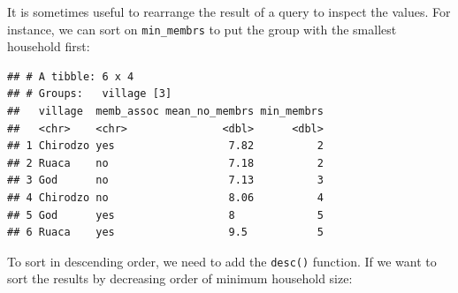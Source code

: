 \documentclass[]{book}
\newenvironment{Shaded}{\begin{snugshade}}{\end{snugshade}}
\newcommand{\KeywordTok}[1]{\textcolor[rgb]{0.13,0.29,0.53}{\textbf{#1}}}
\newcommand{\DataTypeTok}[1]{\textcolor[rgb]{0.13,0.29,0.53}{#1}}
\newcommand{\StringTok}[1]{\textcolor[rgb]{0.31,0.60,0.02}{#1}}
\newcommand{\OperatorTok}[1]{\textcolor[rgb]{0.81,0.36,0.00}{\textbf{#1}}}
\newcommand{\NormalTok}[1]{#1}
\begin{document}
It is sometimes useful to rearrange the result of a query to inspect the
values. For instance, we can sort on \texttt{min\_membrs} to put the
group with the smallest household first:

\begin{Shaded}
\end{Shaded}

\begin{verbatim}
## # A tibble: 6 x 4
## # Groups:   village [3]
##   village  memb_assoc mean_no_membrs min_membrs
##   <chr>    <chr>               <dbl>      <dbl>
## 1 Chirodzo yes                  7.82          2
## 2 Ruaca    no                   7.18          2
## 3 God      no                   7.13          3
## 4 Chirodzo no                   8.06          4
## 5 God      yes                  8             5
## 6 Ruaca    yes                  9.5           5
\end{verbatim}

To sort in descending order, we need to add the \texttt{desc()}
function. If we want to sort the results by decreasing order of minimum
household size:

\begin{Shaded}
\end{Shaded}
\end{document}
